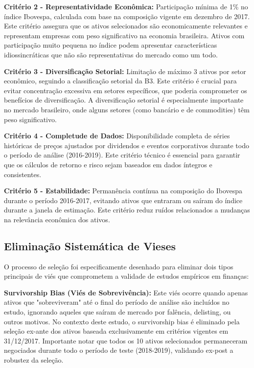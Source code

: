 \textbf{Critério 2 - Representatividade Econômica:} Participação mínima de 1\% no índice Ibovespa, calculada com base na composição vigente em dezembro de 2017. Este critério assegura que os ativos selecionados são economicamente relevantes e representam empresas com peso significativo na economia brasileira. Ativos com participação muito pequena no índice podem apresentar características idiossincráticas que não são representativas do mercado como um todo.

\textbf{Critério 3 - Diversificação Setorial:} Limitação de máximo 3 ativos por setor econômico, seguindo a classificação setorial da B3. Este critério é crucial para evitar concentração excessiva em setores específicos, que poderia comprometer os benefícios de diversificação. A diversificação setorial é especialmente importante no mercado brasileiro, onde alguns setores (como bancário e de commodities) têm peso significativo.

\textbf{Critério 4 - Completude de Dados:} Disponibilidade completa de séries históricas de preços ajustados por dividendos e eventos corporativos durante todo o período de análise (2016-2019). Este critério técnico é essencial para garantir que os cálculos de retorno e risco sejam baseados em dados íntegros e consistentes.

\textbf{Critério 5 - Estabilidade:} Permanência contínua na composição do Ibovespa durante o período 2016-2017, evitando ativos que entraram ou saíram do índice durante a janela de estimação. Este critério reduz ruídos relacionados a mudanças na relevância econômica dos ativos.

\subsection{Eliminação Sistemática de Vieses}

O processo de seleção foi especificamente desenhado para eliminar dois tipos principais de viés que comprometem a validade de estudos empíricos em finanças:

\textbf{Survivorship Bias (Viés de Sobrevivência):} Este viés ocorre quando apenas ativos que "sobreviveram" até o final do período de análise são incluídos no estudo, ignorando aqueles que saíram de mercado por falência, delisting, ou outros motivos. No contexto deste estudo, o survivorship bias é eliminado pela seleção ex-ante dos ativos baseada exclusivamente em critérios vigentes em 31/12/2017. Importante notar que todos os 10 ativos selecionados permaneceram negociados durante todo o período de teste (2018-2019), validando ex-post a robustez da seleção.

